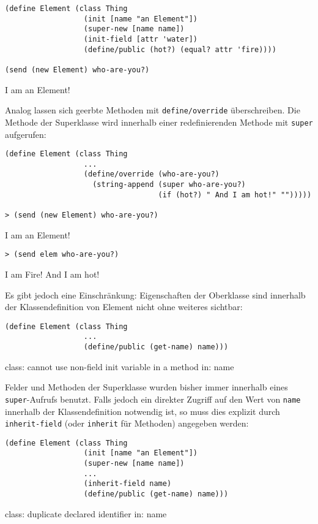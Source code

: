 \begin{lstlisting}
(define Element (class Thing 
                  (init [name "an Element"])
                  (super-new [name name])
                  (init-field [attr 'water])
                  (define/public (hot?) (equal? attr 'fire))))
  
(send (new Element) who-are-you?)
\end{lstlisting}
{\routput {\qq}I am an Element!\qq}

Analog lassen sich geerbte Methoden mit \texttt{define/override} überschreiben. Die Methode der Superklasse wird innerhalb einer redefinierenden Methode mit \texttt{super} aufgerufen:

\begin{lstlisting}
(define Element (class Thing 
                  ...
                  (define/override (who-are-you?)
                    (string-append (super who-are-you?)
                                   (if (hot?) " And I am hot!" "")))))
                                   
> (send (new Element) who-are-you?)
\end{lstlisting}
{\routput {\qq}I am an Element!\qq}

\begin{lstlisting}
> (send elem who-are-you?)
\end{lstlisting}
{\routput {\qq}I am Fire! And I am hot!\qq}

Es gibt jedoch eine Einschränkung: Eigenschaften der Oberklasse sind innerhalb der Klassendefinition von Element nicht ohne weiteres sichtbar: 

\begin{lstlisting}
(define Element (class Thing 
                  ...
                  (define/public (get-name) name)))
\end{lstlisting}
{\rerror class: cannot use non-field init variable in a method in: name}

Felder und Methoden der Superklasse wurden bisher immer innerhalb eines \texttt{super}-Aufrufs benutzt. Falls jedoch ein direkter Zugriff auf den Wert von \texttt{name} innerhalb der Klassendefinition notwendig ist, so muss dies explizit durch \texttt{inherit-field} (oder \texttt{inherit} für Methoden) angegeben werden:

\begin{lstlisting}
(define Element (class Thing 
                  (init [name "an Element"])
                  (super-new [name name])
                  ...
                  (inherit-field name)
                  (define/public (get-name) name)))
\end{lstlisting}
{\rerror  class: duplicate declared identifier in: name}

